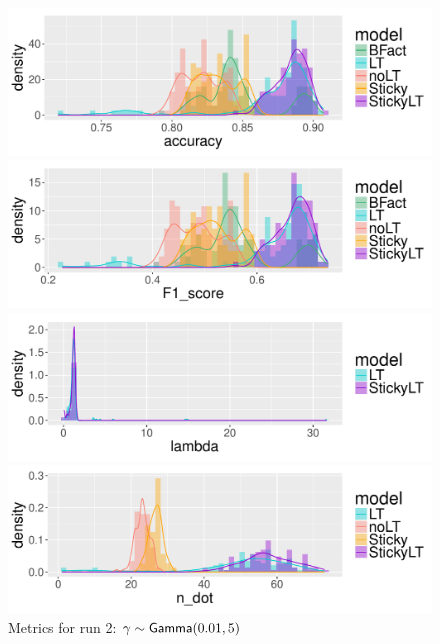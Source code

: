 \begin{figure}[tb]
  \centering
  \begin{minipage}{0.75\textwidth}
  \includegraphics[width = \textwidth]{fig/cocktail/synth_s16_m12/hyper_gamma/h10.0_nocs_cp0/a0p01b5/accuracy_density.pdf}
\end{minipage}

\begin{minipage}{0.75\textwidth}
  \includegraphics[width = \textwidth]{fig/cocktail/synth_s16_m12/hyper_gamma/h10.0_nocs_cp0/a0p01b5/F1_score_density.pdf}
\end{minipage}

\begin{minipage}{0.75\textwidth}
  \includegraphics[width = \textwidth]{fig/cocktail/synth_s16_m12/hyper_gamma/h10.0_nocs_cp0/a0p01b5/lambda_density.pdf}
\end{minipage}

\begin{minipage}{0.75\textwidth}
  \includegraphics[width = \textwidth]{fig/cocktail/synth_s16_m12/hyper_gamma/h10.0_nocs_cp0/a0p01b5/n_dot_density.pdf}
\end{minipage}
\caption{Metrics for run 2: $\gamma \sim \mathsf{Gamma}(0.01,5)$}
\end{figure}

